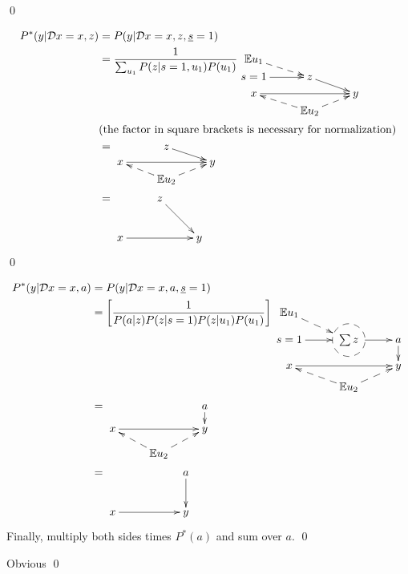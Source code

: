 \qed

\begin{claim}
\label{cl-decTransferDirect}
\decTransferDirect
\end{claim}
\proof
\begin{align}
P^*(y|\cald x=x,z) &=
P(y|\cald x=x,z, \rvs=1)
\\
&=
\frac{1}{\sum_{u_1}P(z|s=1, u_1)P(u_1)}
\xymatrix@R=.2pc{
\EE u_1\ar@{-->}[dr]
\\
s=1\ar[r]
&z\ar[rd]
&
\\
x\ar[rr]
&&y
\\
&\EE u_2\ar@{-->}[ur]\ar@{-->}[ul]
}\\
& \text{(the factor in square brackets is necessary for normalization)}\nonumber
\\
&=
\xymatrix@R=.2pc{
&z\ar[rd]
&
\\
x\ar[rr]
&&y
\\
&\EE u_2\ar@{-->}[ur]\ar@{-->}[ul]
}
\\
&=
\xymatrix{
&z\ar[rd]
&
\\
x\ar[rr]
&&y
}
\end{align}
\qed

\begin{claim}
\label{cl-decTransferBox}
\decTransferBox
\end{claim}
\proof
\begin{align}
P^*(y|\cald x=x, a) &=
P(y|\cald x=x,a,\rvs=1)
\\
&=
\left[\frac {1}{P(a|z)P(z|s=1)P(z|u_1)P(u_1)}\right]
\xymatrix@R=.5pc{
\EE u_1\ar@{-->}[dr]
\\
s=1\ar[r]
&*++[F-o]{\sum z}\ar[r]
&a \ar[d]
\\
x\ar[rr]
&&y
\\
&\EE u_2\ar@{-->}[ur]\ar@{-->}[ul]
}
\\
&=
\xymatrix@R=.75pc{
&&a\ar[d]
&
\\
x\ar[rr]
&&y
\\
&\EE u_2\ar@{-->}[ur]\ar@{-->}[ul]
}
\\
&=
\xymatrix{
&&a\ar[d]
&
\\
x\ar[rr]
&&y
}
\end{align}
Finally, multiply both sides times $P^*(a)$
and sum over $a$.
\qed


\begin{claim}
\label{cl-decTransferNon}
\decTransferNon
\end{claim}
\proof

Obvious
\qed



